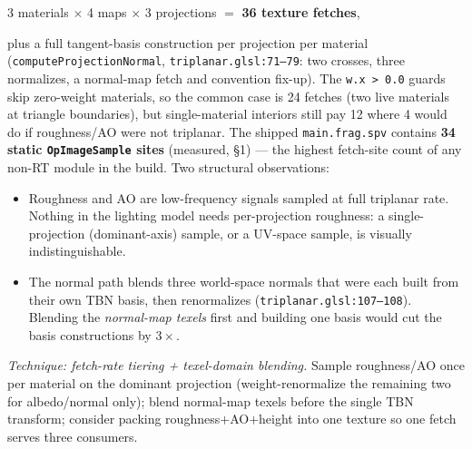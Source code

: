 \documentclass[11pt,a4paper]{article}
\begin{document}
\begin{center}
3 materials $\times$ 4 maps $\times$ 3 projections $=$ \textbf{36 texture fetches},
\end{center}

plus a full tangent-basis construction per projection per material
(\texttt{computeProjectionNormal}, \texttt{triplanar.glsl:71--79}: two
crosses, three normalizes, a normal-map fetch and convention fix-up). The
\texttt{w.x > 0.0} guards skip zero-weight materials, so the common case is
24 fetches (two live materials at triangle boundaries), but single-material
interiors still pay 12 where 4 would do if roughness/AO were not triplanar.
The shipped \texttt{main.frag.spv} contains \textbf{34 static
\texttt{OpImageSample} sites} (measured, \S1) --- the highest fetch-site count
of any non-RT module in the build. Two structural observations:

\begin{itemize}
    \item Roughness and AO are low-frequency signals sampled at full
    triplanar rate. Nothing in the lighting model needs per-projection
    roughness: a single-projection (dominant-axis) sample, or a UV-space
    sample, is visually indistinguishable.
    \item The normal path blends three world-space normals that were each
    built from their own TBN basis, then renormalizes
    (\texttt{triplanar.glsl:107--108}). Blending the \emph{normal-map texels}
    first and building one basis would cut the basis constructions by $3\times$.
\end{itemize}

\textit{Technique: fetch-rate tiering + texel-domain blending.} Sample
roughness/AO once per material on the dominant projection (weight-renormalize
the remaining two for albedo/normal only); blend normal-map texels before the
single TBN transform; consider packing roughness$+$AO$+$height into one
texture so one fetch serves three consumers.
\end{document}
